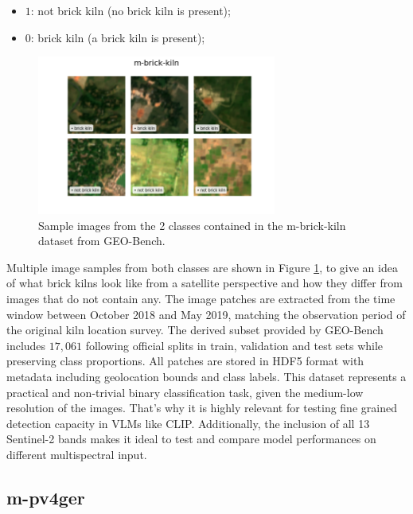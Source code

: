 \documentclass[a4paper, oneside, english]{sapthesis} %
\begin{document}
\begin{itemize}
    \item $1$: not brick kiln (no brick kiln is present);
    \item $0$: brick kiln (a brick kiln is present);
\end{itemize}

\vspace{-0.3cm}

\begin{figure}[h]
    \centering
    \includegraphics[width=0.7\textwidth]{img/m-brick-kiln_image_grid.png}
    \vspace{-0.5cm}
    \caption{\normalsize Sample images from the 2 classes contained in the m-brick-kiln dataset from GEO-Bench.}
    \label{fig:brickgrid}
\end{figure}

Multiple image samples from both classes are shown in Figure \ref{fig:brickgrid}, to give an idea of what brick kilns look like from a satellite perspective and how they differ from images that do not contain any. The image patches are extracted from the time window between October 2018 and May 2019, matching the observation period of the original kiln location survey. The derived subset provided by GEO-Bench includes $17,061$ following official splits in train, validation and test sets while preserving class proportions. All patches are stored in HDF5 format with metadata including geolocation bounds and class labels.
This dataset represents a practical and non-trivial binary classification task, given the medium-low resolution of the images. That's why it is highly relevant for testing fine grained detection capacity in VLMs like CLIP. Additionally, the inclusion of all 13 Sentinel-2 bands makes it ideal to test and compare model performances on different multispectral input.


\subsection{m-pv4ger}
\end{document}

